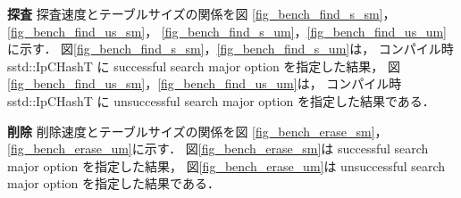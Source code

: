 %
{\bf 探査}
\samepage\newline\indent
探査速度とテーブルサイズの関係を図
\ref{fig_bench_find_s_sm}，\ref{fig_bench_find_us_sm}，
\ref{fig_bench_find_s_um}，\ref{fig_bench_find_us_um}に示す．
図\ref{fig_bench_find_s_sm}，\ref{fig_bench_find_s_um}は，
コンパイル時 sstd::IpCHashT に successful search major option を指定した結果，
図\ref{fig_bench_find_us_sm}，\ref{fig_bench_find_us_um}は，
コンパイル時 sstd::IpCHashT に unsuccessful search major option を指定した結果である．
\leavevmode \newline

%
{\bf 削除}
\samepage\newline\indent
削除速度とテーブルサイズの関係を図
\ref{fig_bench_erase_sm}，
\ref{fig_bench_erase_um}に示す．
図\ref{fig_bench_erase_sm}は successful search major option を指定した結果，
図\ref{fig_bench_erase_um}は unsuccessful search major option を指定した結果である．
\leavevmode \newline








